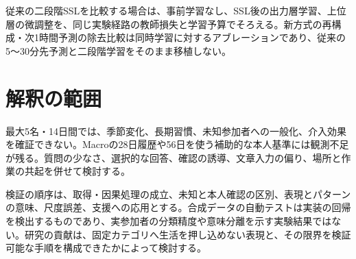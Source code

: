 従来の二段階SSLを比較する場合は、事前学習なし、SSL後の出力層学習、上位層の微調整を、同じ実験経路の教師損失と学習予算でそろえる。新方式の再構成・次1時間予測の除去比較は同時学習に対するアブレーションであり、従来の5〜30分先予測と二段階学習をそのまま移植しない。

\section{解釈の範囲}

最大5名・14日間では、季節変化、長期習慣、未知参加者への一般化、介入効果を確証できない。Macroの28日履歴や56日を使う補助的な本人基準には観測不足が残る。質問の少なさ、選択的な回答、確認の誘導、文章入力の偏り、場所と作業の共起を併せて検討する。

検証の順序は、取得・因果処理の成立、未知と本人確認の区別、表現とパターンの意味、尺度誤差、支援への応用とする。合成データの自動テストは実装の回帰を検出するものであり、実参加者の分類精度や意味分離を示す実験結果ではない。研究の貢献は、固定カテゴリへ生活を押し込めない表現と、その限界を検証可能な手順を構成できたかによって検討する。
